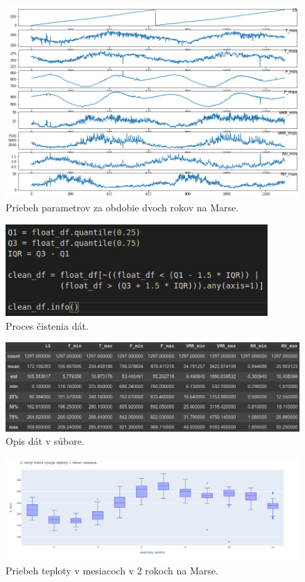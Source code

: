 \begin{figure}[!htbp]
  \centering
  \includegraphics[width=16cm]{img/full_df.png}
  \caption{Priebeh parametrov za obdobie dvoch rokov na Marse.}
  \label{fulldf}
\end{figure}

\begin{figure}[!htbp]
  \centering
  \includegraphics[width=10cm]{img/clean_data.png}
  \caption{Proces čistenia dát.}
  \label{cleandf}
\end{figure}

\begin{figure}[!htbp]
  \centering
  \includegraphics[width=16cm]{img/df_desc.png}
  \caption{Opis dát v súbore.}
  \label{dfdesc}
\end{figure}

\begin{figure}[!htbp]
  \centering
  \includegraphics[width=16cm]{img/monthly_temp.png}
  \caption{Priebeh teploty v mesiacoch v 2 rokoch na Marse.}
  \label{dfdesc}
\end{figure}

